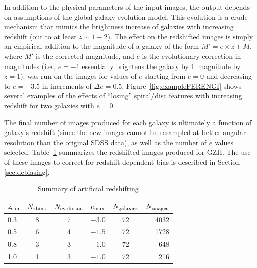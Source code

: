 \documentclass[twocolumn]{aastex6}
\begin{document}
In addition to the physical parameters of the input images, the \ferengi{}
output depends on assumptions of the global galaxy evolution model. This
evolution is a crude mechanism that mimics the brightness increase of galaxies
with increasing redshift (out to at least $z\sim1-2$). The effect on the
redshifted images is simply an empirical addition to the magnitude of a galaxy
of the form $M' = e\times z + M$, where $M'$ is the corrected magnitude, and
$e$ is the evolutionary correction in magnitudes (i.e., $e=-1$ essentially
brightens the galaxy by 1~magnitude by $z=1$). \ferengi{} was run on the images
for values of $e$ starting from $e=0$ and decreasing to $e=-3.5$ in increments
of $\Delta e = 0.5$. Figure~\ref{fig:exampleFERENGI} shows several examples
of the effects of ``losing'' spiral/disc features with increasing redshift
for two galaxies with $e=0$. 

The final number of \ferengi{} images produced for each galaxy is ultimately a
function of galaxy's redshift (since the new images cannot be resampled at
better angular resolution than the original SDSS data), as well as the number
of $e$ values selected. Table~\ref{tbl:ferengivalues} summarizes the redshifted
images produced for GZH. The use of these images to correct for redshift-dependent
bias is described in Section \ref{sec:debiasing}.

\begin{table}
\caption{Summary of \ferengi{} artificial redshifting \label{tbl:ferengivalues}}
\begin{tabular}{lccccr}
\hline\hline
$z_{\rm sim}$ & $N_{z {\rm bins}}$ & $N_{\rm evolution}$ & $e_{\rm max}$ & $N_{\rm galaxies}$ & $N_{\rm images}$\\
\hline
0.3              & 8                  & 7                   & $-3.0$        & 72             & 4032 \\
0.5              & 6                  & 4                   & $-1.5$        & 72             & 1728 \\
0.8              & 3                  & 3                   & $-1.0$        & 72             &  648 \\
1.0              & 1                  & 3                   & $-1.0$        & 72             &  216 \\
\hline\hline
\end{tabular}
\end{table}
\end{document}
